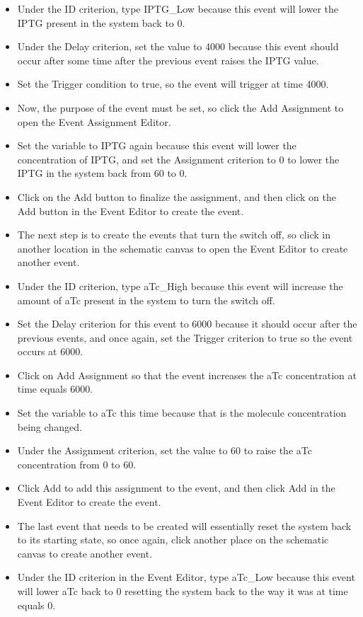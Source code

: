 \documentclass[titlepage,11pt]{article}
\begin{document}
\begin{itemize}
\item Under the ID criterion, type IPTG\_Low because this event will lower the IPTG present in the system back to 0.
\item Under the Delay criterion, set the value to 4000 because this event should occur after some time after the previous event raises the IPTG value.
\item Set the Trigger condition to true, so the event will trigger at time 4000.
\item Now, the purpose of the event must be set, so click the Add Assignment to open the Event Assignment Editor.
\item Set the variable to IPTG again because this event will lower the concentration of IPTG, and set the Assignment criterion to 0 to lower the IPTG in the system back from 60 to 0.
\item Click on the Add button to finalize the assignment, and then click on the Add button in the Event Editor to create the event.
\item The next step is to create the events that turn the switch off, so click in another location in the schematic canvas to open the Event Editor to create another event.
\item Under the ID criterion, type aTc\_High because this event will increase the amount of aTc present in the system to turn the switch off.
\item Set the Delay criterion for this event to 6000 because it should occur after the previous events, and once again, set the Trigger criterion to true so the event occurs at 6000.
\item Click on Add Assignment so that the event increases the aTc concentration at time equals 6000.
\item Set the variable to aTc this time because that is the molecule concentration being changed.
\item Under the Assignment criterion, set the value to 60 to raise the aTc concentration from 0 to 60.
\item Click Add to add this assignment to the event, and then click Add in the Event Editor to create the event.
\item The last event that needs to be created will essentially reset the system back to its starting state, so once again, click another place on the schematic canvas to create another event.
\item Under the ID criterion in the Event Editor, type aTc\_Low because this event will lower aTc back to 0 resetting the system back to the way it was at time equals 0.

\end{itemize}
\end{document}
